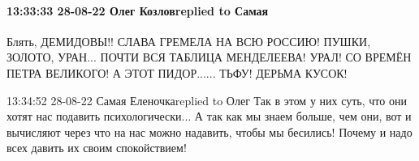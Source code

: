 
 
 
 
 

\paragraph{13:33:33 28-08-22 Олег Козловreplied to Самая}

Блять, ДЕМИДОВЫ!! СЛАВА ГРЕМЕЛА НА ВСЮ РОССИЮ! ПУШКИ, ЗОЛОТО, УРАН... ПОЧТИ ВСЯ
ТАБЛИЦА МЕНДЕЛЕЕВА! УРАЛ! СО ВРЕМЁН ПЕТРА ВЕЛИКОГО! А ЭТОТ ПИДОР...... ТЬФУ!
ДЕРЬМА КУСОК!

13:34:52 28-08-22
Самая Еленочкаreplied to Олег
Так в этом у них суть, что они хотят нас подавить психологически... А так как мы знаем больше, чем они, вот и вычисляют через что на нас можно надавить, чтобы мы бесились! Почему и надо всех давить их своим спокойствием!
